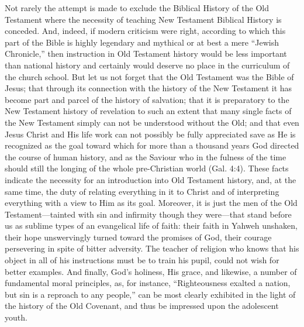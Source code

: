 Not rarely the attempt is made to exclude the Biblical History of the Old Testament where the necessity of teaching New Testament Biblical History is conceded. And, indeed, if modern criticism were right, according to which this part of the Bible is highly legendary and mythical or at best a mere “Jewish Chronicle,” then instruction in Old Testament history would be less important than national history and certainly would deserve no place in the curriculum of the church school. But let us not forget that the Old Testament was the Bible of Jesus; that through its connection with the history of the New Testament it has become part and parcel of the history of salvation; that it is preparatory to the New Testament history of revelation to such an extent that many single facts of the New Testament simply can not be understood without the Old; and that even Jesus Christ and His life work can not possibly be fully appreciated save as He is recognized as the goal toward which for more than a thousand years God directed the course of human history, and as the Saviour who in the fulness of the time should still the longing of the whole pre-Christian world (Gal. 4:4). These facts indicate the necessity for an introduction into Old Testament history, and, at the same time, the duty of relating everything in it to Christ and of interpreting everything with a view to Him as its goal. Moreover, it is just the men of the Old Testament—tainted with sin and infirmity though they were—that stand before us as sublime types of an evangelical life of faith: their
faith in Yahweh unshaken, their hope unswervingly turned toward the promises of God, their courage persevering in spite of bitter adversity. The teacher of religion who knows that his object in all of his instructions must be to train his pupil, could not wish for better examples. And finally, God’s holiness, His grace, and likewise, a number of fundamental moral principles, as, for instance, “Righteousness exalted a nation, but sin is a reproach to any people,” can be most clearly exhibited in the light of the history of the Old Covenant, and thus be impressed upon the adolescent youth.

